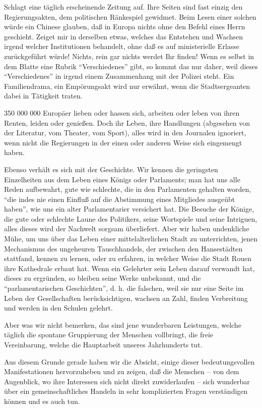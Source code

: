 \documentclass{scrbook}
\begin{document}
Schlagt eine täglich erscheinende Zeitung auf. Ihre Seiten sind fast einzig den Regierungsakten, dem politischen Ränkespiel gewidmet. Beim Lesen einer solchen würde ein Chinese glauben, daß in Europa nichts ohne den Befehl eines Herrn geschieht. Zeiget mir in derselben etwas, welches das Entstehen und Wachsen irgend welcher Institutionen behandelt, ohne daß es auf ministerielle Erlasse zurückgeführt würde! Nichts, rein gar nichts werdet Ihr finden! Wenn es selbst in dem Blatte eine Rubrik ``Verschiedenes'' gibt, so kommt das nur daher, weil dieses ``Verschiedenes'' in irgend einem Zusammenhang mit der Polizei steht. Ein Familiendrama, ein Empörungsakt wird nur erwähnt, wenn die Stadtsergeanten dabei in Tätigkeit traten.

350 000 000 Europäer lieben oder hassen sich, arbeiten oder leben von ihren Renten, leiden oder genießen. Doch ihr Leben, ihre Handlungen (abgesehen von der Literatur, vom Theater, vom Sport), alles wird in den Journalen ignoriert, wenn nicht die Regierungen in der einen oder anderen Weise sich eingemengt haben.

Ebenso verhält es sich mit der Geschichte. Wir kennen die geringsten Einzelheiten aus dem Leben eines Königs oder Parlaments; man hat uns alle Reden aufbewahrt, gute wie schlechte, die in den Parlamenten gehalten worden, ``die indes nie einen Einfluß auf die Abstimmung eines Mitgliedes ausgeübt haben'', wie uns ein alter Parlamentarier versichert hat. Die Besuche der Könige, die gute oder schlechte Laune des Politikers, seine Wortspiele und seine Intriguen, alles dieses wird der Nachwelt sorgsam überliefert. Aber wir haben undenkliche Mühe, um uns über das Leben einer mittelalterlichen Stadt zu unterrichten, jenen Mechanismus des ungeheuren Tauschhandels, der zwischen den Hansestädten stattfand, kennen zu lernen, oder zu erfahren, in welcher Weise die Stadt Rouen ihre Kathedrale erbaut hat. Wenn ein Gelehrter sein Leben darauf verwandt hat, dieses zu ergründen, so bleiben seine Werke unbekannt, und die ``parlamentarischen Geschichten'', d. h. die falschen, weil sie nur eine Seite im Leben der Gesellschaften berücksichtigen, wachsen an Zahl, finden Verbreitung und werden in den Schulen gelehrt.

Aber was wir nicht bemerken, das sind jene wunderbaren Leistungen, welche täglich die spontane Gruppierung der Menschen vollbringt, die freie Vereinbarung, welche die Hauptarbeit unseres Jahrhunderts tut.

Aus diesem Grunde gerade haben wir die Absicht, einige dieser bedeutungsvollen Manifestationen hervorzuheben und zu zeigen, daß die Menschen – von dem Augenblick, wo ihre Interessen sich nicht direkt zuwiderlaufen – sich wunderbar über ein gemeinschaftliches Handeln in sehr komplizierten Fragen verständigen können und es auch tun.
\end{document}

